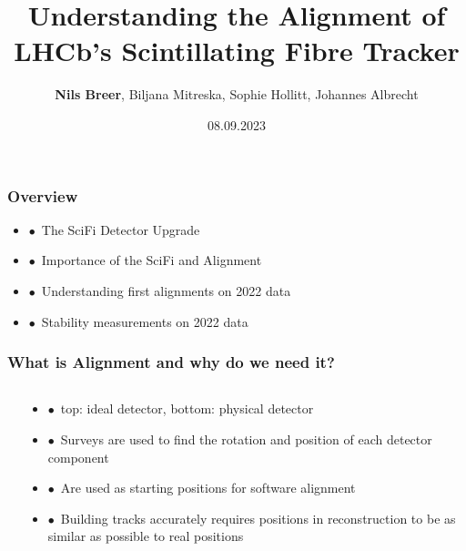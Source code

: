 \documentclass[aspectratio=1610, 12pt, xcolor=dvipsnames]{beamer}
\title{Understanding the Alignment of LHCb's Scintillating Fibre Tracker}
\author[N.Breer]{\textbf{Nils Breer}, Biljana Mitreska, Sophie Hollitt, Johannes Albrecht}
\institute{Maria Laach high energy physics school, Siegen}
\date{08.09.2023}
\begin{document}
\maketitle

\begin{frame}\frametitle{Overview}
  \begin{itemize}
    \item $\bullet$\, The SciFi Detector Upgrade
    \item $\bullet$\, Importance of the SciFi and Alignment
    \item $\bullet$\, Understanding first alignments on 2022 data
    \item $\bullet$\, Stability measurements on 2022 data
  \end{itemize}
\end{frame}

\begin{frame}\frametitle{What is Alignment and why do we need it?}
  \begin{columns}
    \begin{column}[c]{0.48\textwidth}
      
    \end{column}
    \begin{column}[c]{0.48\textwidth}
      \begin{itemize}
        \item $\bullet$\, top: ideal detector, bottom: physical detector
        \item $\bullet$\, Surveys are used to find the rotation and position of each detector component
        \item $\bullet$\, Are used as starting positions for software alignment
        \item $\bullet$\, Building tracks accurately requires positions in reconstruction to be as similar as possible to real positions
      \end{itemize}
    \end{column}
  \end{columns}
\end{frame}
\end{document}
